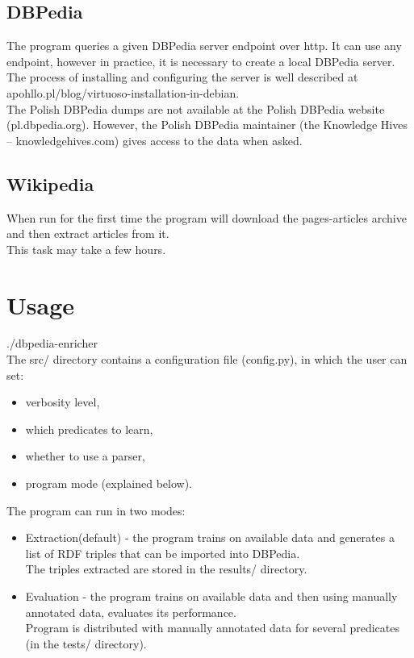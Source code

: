 \documentclass[12pt]{article}
\begin{document}
    \subsection{DBPedia}
    The program queries a given DBPedia server endpoint over http. It can use any endpoint, however in practice, it is necessary to create a local DBPedia server.\\
    The process of installing and configuring the server is well described at apohllo.pl/blog/virtuoso-installation-in-debian.\\
    The Polish DBPedia dumps are not available at the Polish DBPedia website (pl.dbpedia.org). However, the Polish DBPedia maintainer (the Knowledge Hives – knowledgehives.com) gives access to the data when asked.\\
    \subsection{Wikipedia}
    When run for the first time the program will download the pages-articles archive and then extract articles from it.\\
    This task may take a few hours.
    \section{Usage}
    ./dbpedia-enricher\\
    The src/ directory contains a configuration file (config.py), in which the user can set:
    \begin{itemize}
        \item verbosity level,
        \item which predicates to learn,
        \item whether to use a parser,
        \item program mode (explained below).
    \end{itemize}
    The program can run in two modes:
    \begin{itemize}
        \item Extraction(default) - the program trains on available data and generates a list of RDF triples that can be imported into DBPedia.\\ The triples extracted are stored in the results/ directory.
        \item Evaluation - the program trains on available data and then using manually annotated data, evaluates its performance. \\Program is distributed with manually annotated data for several predicates (in the tests/ directory).
    \end{itemize}
\end{document}

